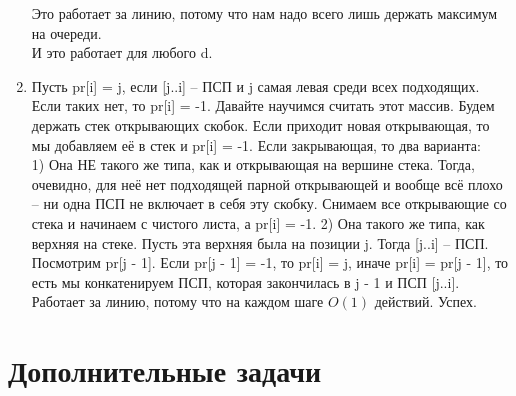 \documentclass[12pt]{article}
\begin{document}
\begin{enumerate}
Это работает за линию, потому что нам надо всего лишь держать максимум на очереди. \\
И это работает для любого d. \\
	\item Пусть pr[i] = j, если [j..i] -- ПСП и j самая левая среди всех подходящих. Если таких нет, то pr[i] = -1. Давайте научимся считать этот массив. Будем держать стек открывающих скобок. Если приходит новая открывающая, то мы добавляем её в стек и pr[i] = -1. Если закрывающая, то два варианта: \\
1) Она НЕ такого же типа, как и открывающая на вершине стека. Тогда, очевидно, для неё нет подходящей парной открывающей и вообще всё плохо -- ни одна ПСП не включает в себя эту скобку. Снимаем все открывающие со стека и начинаем с чистого листа, а pr[i] = -1.
2) Она такого же типа, как верхняя на стеке. Пусть эта верхняя была на позиции j. Тогда [j..i] -- ПСП. Посмотрим pr[j - 1]. Если pr[j - 1] = -1, то pr[i] = j, иначе pr[i] = pr[j - 1], то есть мы конкатенируем ПСП, которая закончилась в j - 1 и ПСП [j..i]. Работает за линию, потому что на каждом шаге $O(1)$ действий. Успех. \\
\end{enumerate}

\section{Дополнительные задачи}
\end{document}
